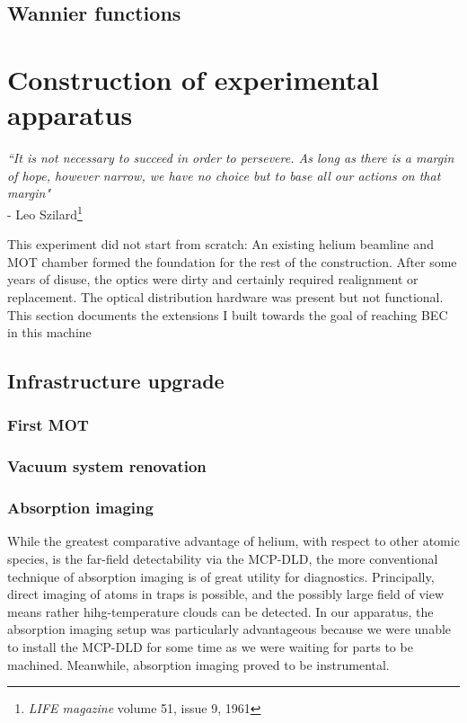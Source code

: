 \subsection{Wannier functions}


\section{Construction of experimental apparatus}

\begin{adjustwidth}{1cm}{0cm}
\begin{flushright}
\emph{``It is not necessary to succeed in order to persevere. As long as there is a margin of hope, however narrow, we have no choice but to base all our actions on that margin"}\\
- Leo Szilard\footnote{\emph{LIFE magazine} volume 51, issue 9, 1961 }\\
\end{flushright}
\end{adjustwidth}

This experiment did not start from scratch: An existing helium beamline and MOT chamber formed the foundation for the rest of the construction. After some years of disuse, the optics were dirty and certainly required realignment or replacement. The optical distribution hardware was present but not functional. This section documents the extensions I built towards the goal of reaching BEC in this machine

\subsection*{Infrastructure upgrade}

\subsubsection{First MOT}
\subsubsection{Vacuum system renovation}
\subsubsection*{Absorption imaging}

While the greatest comparative advantage of helium, with respect to other atomic species, is the far-field detectability via the MCP-DLD, the more conventional technique of absorption imaging is of great utility for diagnostics. Principally, direct imaging of atoms in traps is possible, and the possibly large field of view means rather hihg-temperature clouds can be detected. In our apparatus, the absorption imaging setup was particularly advantageous because we were unable to install the MCP-DLD for some time as we were waiting for parts to be machined. Meanwhile, absorption imaging proved to be instrumental.

